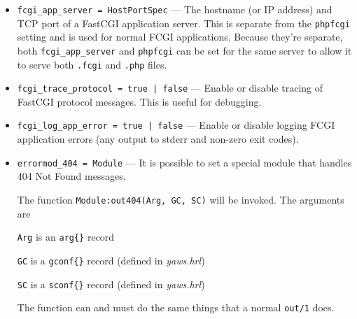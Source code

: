 \documentclass[11pt,oneside,english]{book}
\begin{document}
\begin{itemize}
\item       \verb+fcgi_app_server = HostPortSpec+ ---
              The hostname (or IP address) and TCP port of a
              FastCGI application server. This is separate from the
              \verb+phpfcgi+ setting and is used for normal FCGI
              applications. Because they're separate, both
              \verb+fcgi_app_server+ and \verb+phpfcgi+ can be set for
              the same server to allow it to serve both \verb+.fcgi+
              and \verb+.php+ files.

\item       \verb+fcgi_trace_protocol = true | false+ ---
              Enable or disable tracing of FastCGI protocol
              messages. This is useful for debugging.

\item       \verb+fcgi_log_app_error = true | false+ ---
              Enable or disable logging FCGI application errors (any
              output to stderr and non-zero exit codes).

\item     \verb+errormod_404 = Module+ ---
              It is possible to set a special module  that
              handles 404 Not Found messages.

              The function \verb+Module:out404(Arg, GC, SC)+ will
              be invoked. The arguments are

              \verb+Arg+ is an \verb+arg{}+ record

              \verb+GC+ is a \verb+gconf{}+ record (defined in
              \textit{yaws.hrl})

              \verb+SC+ is a \verb+sconf{}+ record (defined in
              \textit{yaws.hrl})

              The function can and must do the same things
              that a normal \verb+out/1+ does.


\end{itemize}
\end{document}
